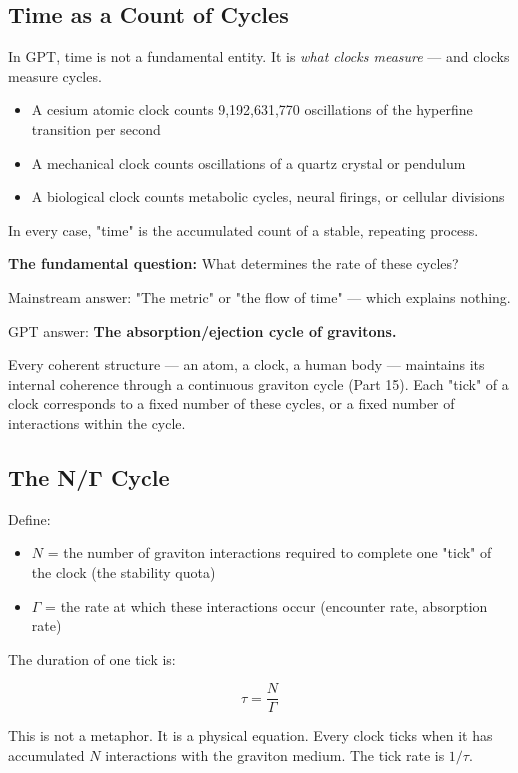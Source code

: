 \documentclass[12pt, a4paper]{article}
\begin{document}
\subsection{Time as a Count of Cycles}
\label{subsec:time_cycles}

In GPT, time is not a fundamental entity. It is \textit{what clocks measure} — and clocks measure cycles.

\begin{itemize}
    \item A cesium atomic clock counts 9,192,631,770 oscillations of the hyperfine transition per second
    \item A mechanical clock counts oscillations of a quartz crystal or pendulum
    \item A biological clock counts metabolic cycles, neural firings, or cellular divisions
\end{itemize}

In every case, "time" is the accumulated count of a stable, repeating process.

\textbf{The fundamental question:} What determines the rate of these cycles?

Mainstream answer: "The metric" or "the flow of time" — which explains nothing.

GPT answer: \textbf{The absorption/ejection cycle of gravitons.}

Every coherent structure — an atom, a clock, a human body — maintains its internal coherence through a continuous graviton cycle (Part 15). Each "tick" of a clock corresponds to a fixed number of these cycles, or a fixed number of interactions within the cycle.

\subsection{The N/Γ Cycle}
\label{subsec:NGamma_cycle}

Define:
\begin{itemize}
    \item \( N \) = the number of graviton interactions required to complete one "tick" of the clock (the stability quota)
    \item \( \Gamma \) = the rate at which these interactions occur (encounter rate, absorption rate)
\end{itemize}

The duration of one tick is:

\[
\tau = \frac{N}{\Gamma}
\]

This is not a metaphor. It is a physical equation. Every clock ticks when it has accumulated \( N \) interactions with the graviton medium. The tick rate is \( 1/\tau \).
\end{document}
